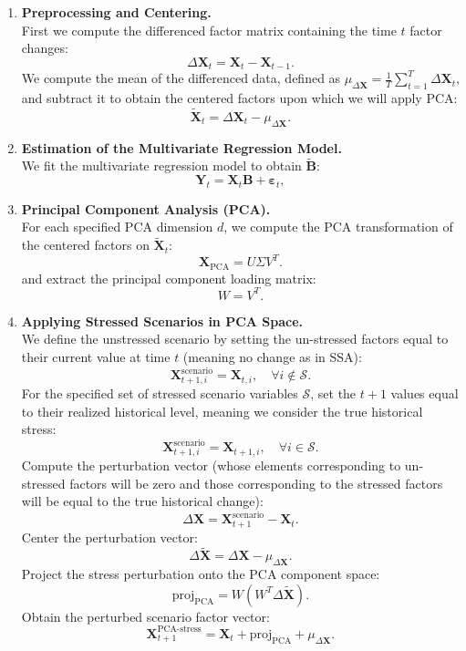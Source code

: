 \documentclass[11pt]{article}
\theoremstyle{plain}
\theoremstyle{definition}
\theoremstyle{remark}
\numberwithin{equation}{section}
\newcommand{\veps}{\varepsilon}
\begin{document}
\begin{enumerate}

    \item \textbf{Preprocessing and Centering.} \\
    First we compute the differenced factor matrix containing the time $t$ factor changes:
    \[
    \Delta \mathbf{X}_t = \mathbf{X}_{t} - \mathbf{X}_{t-1}.
    \]
    We compute the mean of the differenced data, defined as \( \mu_{\Delta \mathbf{X}}=\frac{1}{T} \sum_{t=1}^T \Delta \mathbf{X}_t \), and subtract it to obtain the centered factors upon which we will apply PCA:
    \[
    \tilde{\mathbf{X}}_t = \Delta \mathbf{X}_t - \mu_{\Delta \mathbf{X}}.
    \]

    \item \textbf{Estimation of the Multivariate Regression Model.} \\
    We fit the multivariate regression model to obtain $\mathbf{\tilde{B}}$:
    \[
    \mathbf{Y}_{t} = \mathbf{X}_{t} \mathbf{B} + \mathbf{\veps}_t,
    \]

    \item \textbf{Principal Component Analysis (PCA).} \\
    For each specified PCA dimension \( d \), we compute the PCA transformation of the centered factors on $\tilde{\mathbf{X}}_t$:
    \[
    \mathbf{X}_{\text{PCA}} = U \Sigma V^T.
    \]
     and extract the principal component loading matrix:
    \[
    W = V^T.
    \]

    \item \textbf{Applying Stressed Scenarios in PCA Space.} \\
    We define the unstressed scenario by setting the un-stressed factors equal to their current value at time $t$ (meaning no change as in SSA):
    \[
    \mathbf{X}_{t+1, i}^{\text{scenario}} = \mathbf{X}_{t, i}, \quad \forall i \not \in \mathcal{S}.
    \]
    For the specified set of stressed scenario variables \( \mathcal{S} \), set the $t+1$ values equal to their realized historical level, meaning we consider the true historical stress:
    \[
    \mathbf{X}_{t+1, i}^{\text{scenario}} = \mathbf{X}_{t+1, i}, \quad \forall i \in \mathcal{S}.
    \]
    Compute the perturbation vector (whose elements corresponding to un-stressed factors will be zero and those corresponding to the stressed factors will be equal to the true historical change):
    \[
    \Delta \mathbf{X} = \mathbf{X}_{t+1}^{\text{scenario}} - \mathbf{X}_t.
    \]
    Center the perturbation vector:
    \[
    {\Delta \tilde{\mathbf{X}}} = \Delta \mathbf{X} - \mu_{\Delta \mathbf{X}}.
    \]
    Project the stress perturbation onto the PCA component space:
    \[
    \text{proj}_{\text{PCA}} = W (W^T {\Delta \tilde{\mathbf{X}}}).
    \]
    Obtain the perturbed scenario factor vector:
    \[
    \mathbf{X}_{t+1}^{\text{PCA-stress}} = \mathbf{X}_t + \text{proj}_{\text{PCA}} + \mu_{\Delta \mathbf{X}}.
    \]


\end{enumerate}
\end{document}
